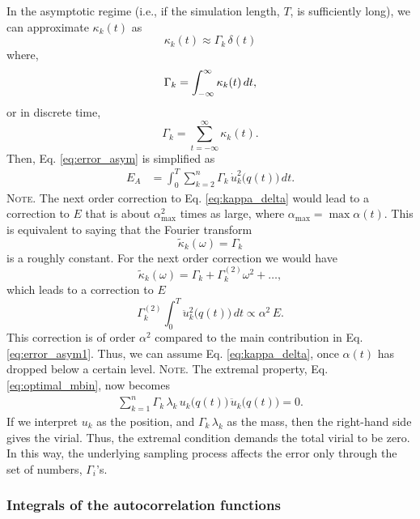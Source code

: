 \documentclass[reprint, floatfix]{revtex4-1}
\newcommand{\note}[1]{{\color{DarkGreen}\footnotesize \textsc{Note.} #1}}
\newcommand{\Err}{E}
\begin{document}
In the asymptotic regime
(i.e., if the simulation length, $T$, is sufficiently long),
we can approximate $\kappa_k(t)$ as
%
\begin{equation}
  \kappa_k(t) \approx \Gamma_k \, \delta(t)
  \label{eq:kappa_delta}
\end{equation}
%
where,
\begin{equation}
  \Gamma_k = \int_{-\infty}^\infty \kappa_k(t) \, dt,
  \notag
\end{equation}
or in discrete time,
\begin{equation}
  \Gamma_k = \sum_{t = -\infty}^\infty \kappa_k(t).
  \label{eq:Gamma_sum}
\end{equation}
%
Then, Eq. \eqref{eq:error_asym} is simplified as
%
\begin{align}
  \Err_A
  &=
  \int_0^T
  \sum_{k = 2}^n
  \Gamma_k \, \dot u_k^2\bigl( q(t) \bigr) \, dt.
  \label{eq:error_asym1}
\end{align}
%
\note{The next order correction to Eq. \eqref{eq:kappa_delta}
would lead to a correction to $\Err$
that is about $\alpha_{\max}^2$ times as large,
where $\alpha_{\max} = \max \alpha(t)$.
%
This is equivalent to saying that the Fourier transform
  $$
  \tilde \kappa_k(\omega) = \Gamma_k
  $$
  is a roughly constant.
  For the next order correction we would have
  $$
  \tilde \kappa_k(\omega) = \Gamma_k + \Gamma^{(2)}_k \omega^2 + \dots,
  $$
  which leads to a correction to $\Err$
  $$
  \Gamma^{(2)}_k
  \int_0^T \ddot u_k^2\bigl( q(t) \bigr) \, dt
  \propto
  \alpha^2 \, \Err.
  $$
  This correction is of order $\alpha^2$
  compared to the main contribution in Eq. \eqref{eq:error_asym1}.
  Thus, we can assume Eq. \eqref{eq:kappa_delta},
  once $\alpha(t)$ has dropped below a certain level.
}
%
\note{
  The extremal property, Eq. \eqref{eq:optimal_mbin},
  now becomes
  \begin{align}
    \sum_{k = 1}^n
      \Gamma_k \, \lambda_k \,
      u_k\bigl( q(t) \bigr) \,
      \ddot u_k\bigl( q(t) \bigr) = 0.
    \label{eq:optimal_mbin1}
  \end{align}
  If we interpret $u_k$ as the position,
  and $\Gamma_k \, \lambda_k$ as the mass,
  then the right-hand side gives the virial.
  Thus, the extremal condition demands
  the total virial to be zero.
  $$\,$$
}
In this way,
the underlying sampling process
affects the error only through the set of numbers, $\Gamma_i$'s.



\subsubsection{\label{sec:Gamma}
Integrals of the autocorrelation functions}
\end{document}

